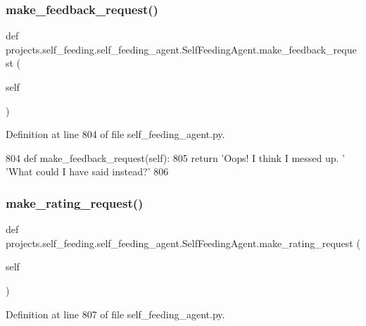 \subsubsection{\texorpdfstring{make\+\_\+feedback\+\_\+request()}{make\_feedback\_request()}}
{\footnotesize\ttfamily def projects.\+self\+\_\+feeding.\+self\+\_\+feeding\+\_\+agent.\+Self\+Feeding\+Agent.\+make\+\_\+feedback\+\_\+request (\begin{DoxyParamCaption}\item[{}]{self }\end{DoxyParamCaption})}



Definition at line 804 of file self\+\_\+feeding\+\_\+agent.\+py.


\begin{DoxyCode}
804     \textcolor{keyword}{def }make\_feedback\_request(self):
805         \textcolor{keywordflow}{return} \textcolor{stringliteral}{'Oops! I think I messed up. '} \textcolor{stringliteral}{'What could I have said instead?'}
806 
\end{DoxyCode}
\mbox{\label{classprojects_1_1self__feeding_1_1self__feeding__agent_1_1SelfFeedingAgent_aa97b64df930c600bd7be1b69779849e7}} 
\subsubsection{\texorpdfstring{make\+\_\+rating\+\_\+request()}{make\_rating\_request()}}
{\footnotesize\ttfamily def projects.\+self\+\_\+feeding.\+self\+\_\+feeding\+\_\+agent.\+Self\+Feeding\+Agent.\+make\+\_\+rating\+\_\+request (\begin{DoxyParamCaption}\item[{}]{self }\end{DoxyParamCaption})}



Definition at line 807 of file self\+\_\+feeding\+\_\+agent.\+py.


